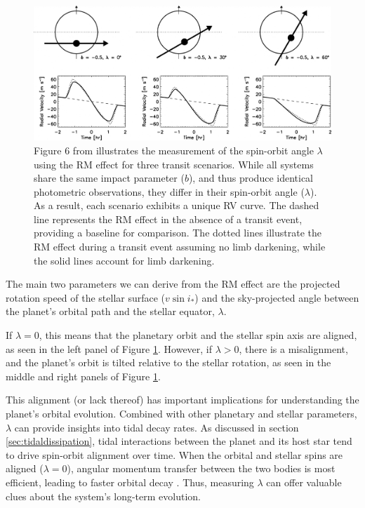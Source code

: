 \documentclass[oneside,12pt]{amsart}
\numberwithin{page}{section}
\begin{document}
\begin{figure}[htbp]
    \centering
    \includegraphics[width=0.9\linewidth]{figs/winn_fig6.jpg}
    \caption{Figure 6 from \citet{winn2010transits} illustrates the measurement of the spin-orbit angle $\lambda$ using the RM effect for three transit scenarios. While all systems share the same impact parameter ($b$), and thus produce identical photometric observations, they differ in their spin-orbit angle ($\lambda$). As a result, each scenario exhibits a unique RV curve. The dashed line represents the RM effect in the absence of a transit event, providing a baseline for comparison. The dotted lines illustrate the RM effect during a transit event assuming no limb darkening, while the solid lines account for limb darkening.}
    \label{fig:winn-fig6}
\end{figure}

The main two parameters we can derive from the RM effect are the projected rotation speed of the stellar surface ($v \sin i_*$) and the sky-projected angle between the planet's orbital path and the stellar equator, $\lambda$.

If $\lambda = 0$, this means that the planetary orbit and the stellar spin axis are aligned, as seen in the left panel of Figure \ref{fig:winn-fig6}. However, if $\lambda > 0$, there is a misalignment, and the planet's orbit is tilted relative to the stellar rotation, as seen in the middle and right panels of Figure \ref{fig:winn-fig6}.

This alignment (or lack thereof) has important implications for understanding the planet's orbital evolution. Combined with other planetary and stellar parameters, $\lambda$ can provide insights into tidal decay rates. As discussed in section \ref{sec:tidaldissipation}, tidal interactions between the planet and its host star tend to drive spin-orbit alignment over time. When the orbital and stellar spins are aligned ($\lambda = 0$), angular momentum transfer between the two bodies is most efficient, leading to faster orbital decay \citep{ogilvie2014tidal}. Thus, measuring $\lambda$ can offer valuable clues about the system’s long-term evolution.
\end{document}
